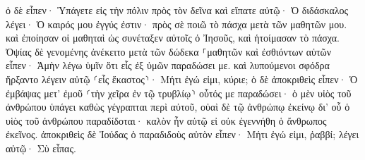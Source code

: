 \documentclass{openreader}
\begin{document}
ὁ δὲ εἶπεν· Ὑπάγετε εἰς τὴν πόλιν πρὸς τὸν δεῖνα καὶ εἴπατε αὐτῷ· Ὁ διδάσκαλος λέγει· Ὁ καιρός μου ἐγγύς ἐστιν· πρὸς σὲ ποιῶ τὸ πάσχα μετὰ τῶν μαθητῶν μου. 
καὶ ἐποίησαν οἱ μαθηταὶ ὡς συνέταξεν αὐτοῖς ὁ Ἰησοῦς, καὶ ἡτοίμασαν τὸ πάσχα. 
Ὀψίας δὲ γενομένης ἀνέκειτο μετὰ τῶν δώδεκα ⸀μαθητῶν 
καὶ ἐσθιόντων αὐτῶν εἶπεν· Ἀμὴν λέγω ὑμῖν ὅτι εἷς ἐξ ὑμῶν παραδώσει με. 
καὶ λυπούμενοι σφόδρα ἤρξαντο λέγειν αὐτῷ ⸂εἷς ἕκαστος⸃· Μήτι ἐγώ εἰμι, κύριε; 
ὁ δὲ ἀποκριθεὶς εἶπεν· Ὁ ἐμβάψας μετ’ ἐμοῦ ⸂τὴν χεῖρα ἐν τῷ τρυβλίῳ⸃ οὗτός με παραδώσει· 
ὁ μὲν υἱὸς τοῦ ἀνθρώπου ὑπάγει καθὼς γέγραπται περὶ αὐτοῦ, οὐαὶ δὲ τῷ ἀνθρώπῳ ἐκείνῳ δι’ οὗ ὁ υἱὸς τοῦ ἀνθρώπου παραδίδοται· καλὸν ἦν αὐτῷ εἰ οὐκ ἐγεννήθη ὁ ἄνθρωπος ἐκεῖνος. 
ἀποκριθεὶς δὲ Ἰούδας ὁ παραδιδοὺς αὐτὸν εἶπεν· Μήτι ἐγώ εἰμι, ῥαββί; λέγει αὐτῷ· Σὺ εἶπας. 
\end{document}
